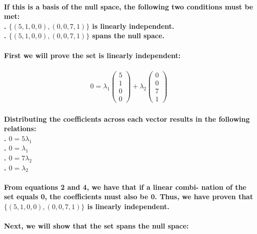 \documentclass{article}
\begin{document}
\paragraph{\large
If this is a basis of the null space, the following two conditions must be met:
\\. $\{(5, 1, 0, 0), (0, 0, 7, 1)\}$ is linearly independent.
\\. $\{(5, 1, 0, 0), (0, 0, 7, 1)\}$ spans the null space.}

\paragraph{\large
First we will prove the set is linearly independent:}

\begin{align*}
0 = \lambda_1
\begin{pmatrix}
    5 \\ 1 \\ 0 \\ 0
\end{pmatrix}
+ \lambda_2
\begin{pmatrix}
    0 \\ 0 \\ 7 \\ 1
\end{pmatrix}
\end{align*}

\paragraph{\large
Distributing the coefficients across each vector results in the following relations:
\\. $0 = 5\lambda_1$
\\. $0 = \lambda_1$
\\. $0 = 7\lambda_2$
\\. $0 = \lambda_2$}

\paragraph{\large
From equations 2 and 4, we have that if a linear combi-
nation of the set equals 0, the coefficients must also be 0. Thus, we have proven that $\{(5, 1, 0, 0), (0, 0, 7, 1)\}$ is linearly independent.}

\paragraph{\large
Next, we will show that the set spans the null space:}
\end{document}
